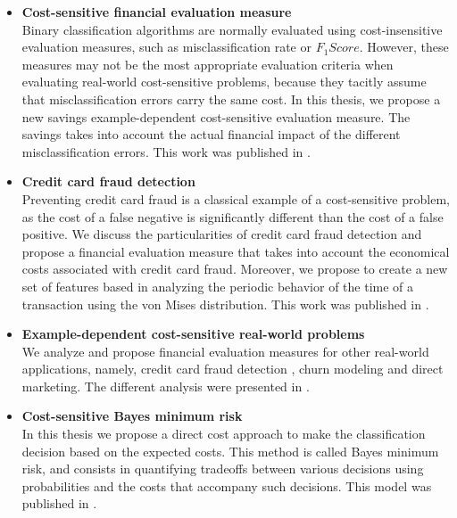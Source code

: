 \begin{itemize}

\item \textbf{Cost-sensitive financial evaluation measure} \\
  Binary classification algorithms are normally evaluated using cost-insensitive 
  evaluation measures, such as misclassification rate or \mbox{$F_1Score$}. However, these 
  measures may not be the most appropriate evaluation criteria when  evaluating  
  real-world cost-sensitive problems, because they tacitly assume that 
  misclassification errors carry the same cost. In this thesis, we propose a new   savings 
  example-dependent cost-sensitive evaluation measure. The savings takes into   account the actual 
  financial impact of the different misclassification errors. This work was published in 
  \citep{CorreaBahnsen2013}.
  
\item \textbf{Credit card fraud detection} \\
  Preventing credit card fraud is a classical example of a cost-sensitive problem, as 
  the cost of a false negative is significantly different than the cost of a false positive. We 
  discuss the particularities of credit card   fraud detection and propose a financial evaluation 
  measure that takes into account the   economical costs associated with credit card fraud. 
  Moreover, we propose to create a new set of features based in analyzing the periodic behavior of 
  the time of a transaction using the von Mises distribution.  This work was published in 
\citep{CorreaBahnsen2013,CorreaBahnsen2014,CorreaBahnsen2015c,CorreaBahnsen2015d}.
  
\item \textbf{Example-dependent cost-sensitive real-world problems} \\
  We analyze and propose financial evaluation measures for other real-world applications, 
  namely, credit card fraud detection , churn modeling and direct marketing.
  The different analysis were presented in 
\citep{CorreaBahnsen2014,CorreaBahnsen2014b,CorreaBahnsen2015a}.

\item \textbf{Cost-sensitive Bayes minimum risk} \\
  In this thesis we propose a direct cost approach to make the classification decision based on 
  the expected costs.   This method is called Bayes minimum risk, and consists in quantifying 
  tradeoffs between various   decisions using   probabilities and the costs that accompany such 
  decisions. This model was published in \citep{CorreaBahnsen2013,CorreaBahnsen2014}.
  

\end{itemize}
